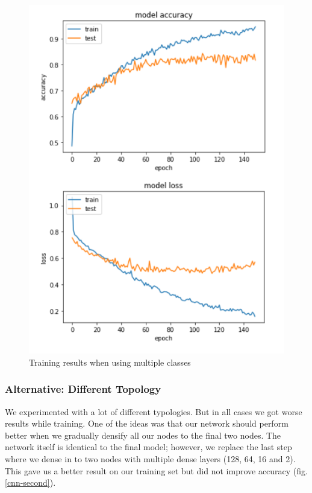 \begin{figure}[ht]
\begin{center}
\centerline{\includegraphics[width=\columnwidth]{images/cnn-multi.png}}
\caption{Training results when using multiple classes}
\label{cnn-multi}
\end{center}
\end{figure}

\subsubsection{Alternative: Different Topology}

We experimented with a lot of different typologies. But in all cases we got worse results while training. One of the ideas was that our network should perform better when we gradually densify all our nodes to the final two nodes. The network itself is identical to the final model; however, we replace the last step where we dense in to two nodes with multiple dense layers (128, 64, 16 and 2). This gave us a better result on our training set but did not improve accuracy (fig. \ref{cnn-second}).

